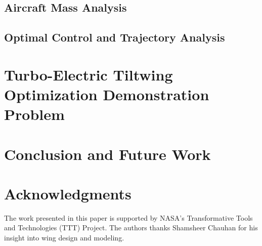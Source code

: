 \documentclass[conf]{new-aiaa}
\begin{document}
\subsection{Aircraft Mass Analysis}

\subsection{Optimal Control and Trajectory Analysis}



\section{Turbo-Electric Tiltwing Optimization Demonstration Problem}\label{sec:opt_prob}


\section{Conclusion and Future Work}\label{sec:conc}


\section*{Acknowledgments}
The work presented in this paper is supported by NASA's Transformative Tools and Technologies (TTT) Project.
The authors thanks Shamsheer Chauhan for his insight into wing design and modeling.


\end{document}
